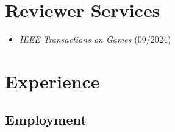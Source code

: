 \documentclass{article}
\begin{document}
	\section*{Reviewer Services}

	\begin{itemize}
		\item \textit{IEEE Transactions on Games} (09/2024) \\
	\end{itemize}

	\section*{Experience}

	\subsection*{Employment}
\end{document}
